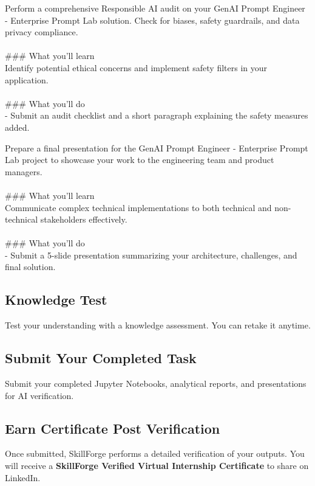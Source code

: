 \documentclass{article}
\begin{document}
Perform a comprehensive Responsible AI audit on your GenAI Prompt Engineer - Enterprise Prompt Lab solution. Check for biases, safety guardrails, and data privacy compliance. \\
 \\
### What you'll learn \\
Identify potential ethical concerns and implement safety filters in your application. \\
 \\
### What you'll do \\
- Submit an audit checklist and a short paragraph explaining the safety measures added.

Prepare a final presentation for the GenAI Prompt Engineer - Enterprise Prompt Lab project to showcase your work to the engineering team and product managers. \\
 \\
### What you'll learn \\
Communicate complex technical implementations to both technical and non-technical stakeholders effectively. \\
 \\
### What you'll do \\
- Submit a 5-slide presentation summarizing your architecture, challenges, and final solution.

\subsection*{Knowledge Test}
Test your understanding with a knowledge assessment. You can retake it anytime.\\

\subsection*{Submit Your Completed Task}
Submit your completed Jupyter Notebooks, analytical reports, and presentations for AI verification.\\

\subsection*{Earn Certificate Post Verification}
Once submitted, SkillForge performs a detailed verification of your outputs. You will receive a \textbf{SkillForge Verified Virtual Internship Certificate} to share on LinkedIn.\\
\end{document}
